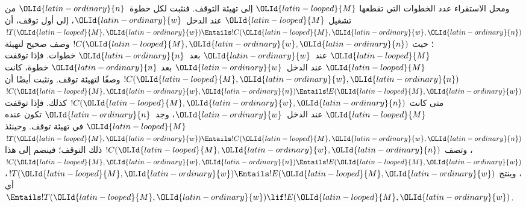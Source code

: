 \documentclass[../../../include/open-logic-section]{subfiles}
\begin{document}
\begin{explain}
ومحل الاستقراء عدد الخطوات التي تقطعها ${\OLId{latin-looped}{M}}$ إلى تهيئة التوقف.
فنثبت لكل خطوة~${\OLId{latin-ordinary}{n}}$ من تشغيل ${\OLId{latin-looped}{M}}$ عند الدخل~${\OLId{latin-ordinary}{w}}$، إلى أول توقف،
أن $!T({\OLId{latin-looped}{M}},{\OLId{latin-ordinary}{w}})\Entails !C({\OLId{latin-looped}{M}},{\OLId{latin-ordinary}{w}},{\OLId{latin-ordinary}{n}})$؛ حيث $!C({\OLId{latin-looped}{M}},{\OLId{latin-ordinary}{w}},{\OLId{latin-ordinary}{n}})$ وصف صحيح
لتهيئة ${\OLId{latin-looped}{M}}$ عند~${\OLId{latin-ordinary}{w}}$ بعد~${\OLId{latin-ordinary}{n}}$ خطوات. فإذا توقفت ${\OLId{latin-looped}{M}}$ عند
الدخل~${\OLId{latin-ordinary}{w}}$ بعد ${\OLId{latin-ordinary}{n}}$ خطوة، كانت $!C({\OLId{latin-looped}{M}},{\OLId{latin-ordinary}{w}},{\OLId{latin-ordinary}{n}})$ وصفًا لتهيئة توقف.
ونثبت أيضًا أن $!C({\OLId{latin-looped}{M}},{\OLId{latin-ordinary}{w}},{\OLId{latin-ordinary}{n}})\Entails !E({\OLId{latin-looped}{M}},{\OLId{latin-ordinary}{w}})$ متى كانت
$!C({\OLId{latin-looped}{M}},{\OLId{latin-ordinary}{w}},{\OLId{latin-ordinary}{n}})$ كذلك. فإذا توقفت ${\OLId{latin-looped}{M}}$ عند الدخل~${\OLId{latin-ordinary}{w}}$، وجد~${\OLId{latin-ordinary}{n}}$
تكون عنده ${\OLId{latin-looped}{M}}$ في تهيئة توقف. وحينئذ
$!T({\OLId{latin-looped}{M}},{\OLId{latin-ordinary}{w}})\Entails !C({\OLId{latin-looped}{M}},{\OLId{latin-ordinary}{w}},{\OLId{latin-ordinary}{n}})$، وتصف $!C({\OLId{latin-looped}{M}},{\OLId{latin-ordinary}{w}},{\OLId{latin-ordinary}{n}})$ ذلك التوقف؛
فينضم إلى هذا $!C({\OLId{latin-looped}{M}},{\OLId{latin-ordinary}{w}},{\OLId{latin-ordinary}{n}})\Entails !E({\OLId{latin-looped}{M}},{\OLId{latin-ordinary}{w}})$، وينتج
$!T({\OLId{latin-looped}{M}},{\OLId{latin-ordinary}{w}})\Entails !E({\OLId{latin-looped}{M}},{\OLId{latin-ordinary}{w}})$، أي
$\Entails !T({\OLId{latin-looped}{M}},{\OLId{latin-ordinary}{w}})\lif !E({\OLId{latin-looped}{M}},{\OLId{latin-ordinary}{w}})$.


\end{explain}
\end{document}
